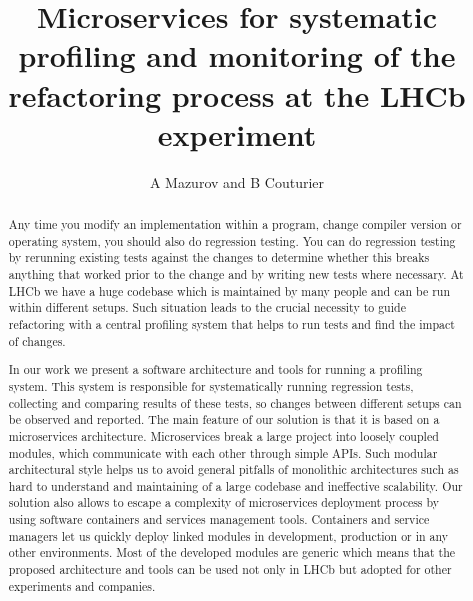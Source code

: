\documentclass[a4paper]{jpconf}
\begin{document}
\title{Microservices for systematic profiling and monitoring of the refactoring process at the LHCb experiment}
\author{A Mazurov and B Couturier}
\thispagestyle{fancy}
\address{ University of Birmingham, Birmingham, United Kingdom}
\address{ CERN, European Organization for Nuclear Research, Geneva, Switzerland}




\newcommand\iamp{{Intel\textsuperscript{\textregistered} VTune\texttrademark Amplifier XE} }
\newcommand\amp{{VTune\texttrademark Amplifier XE} }
\newcommand\intel{{Intel\textsuperscript{\textregistered}} }
\newcommand\google{{Google\textsuperscript{\textregistered} }}
\newcommand\docker{\textit{Docker} }
\newcommand\compose{\textit{Compose} }
\newcommand\composes{\textit{Compose's} }

\begin{abstract}
Any time you modify an implementation within a program, change compiler version
or operating system, you should also do regression testing. You can do
regression testing by rerunning existing tests against the changes to determine
whether this breaks anything that worked prior to the change and by writing new
tests where necessary. At LHCb we have a huge codebase which is maintained by
many people and can be run within different setups. Such situation leads to the
crucial necessity to guide refactoring with a central profiling system that
helps to run tests and find the impact of changes.

In our work we present a software architecture and tools for running a profiling
system. This system is responsible for systematically running regression tests,
collecting and comparing results of these tests, so changes between different
setups can be observed and reported. The main feature of our solution is that it
is based on a microservices architecture. Microservices break a large project
into loosely coupled modules, which communicate with each other through simple
APIs. Such modular architectural style helps us to avoid general pitfalls of
monolithic architectures such as hard to understand and maintaining of a large
codebase and ineffective scalability. Our solution also allows to escape a
complexity of microservices deployment process by using software containers and
services management tools. Containers and service managers let us quickly deploy
linked modules in development, production or in any other environments. Most of
the developed modules are generic which means that the proposed architecture and
tools can be used not only in LHCb but adopted for other experiments and
companies. \end{abstract}
\end{document}
